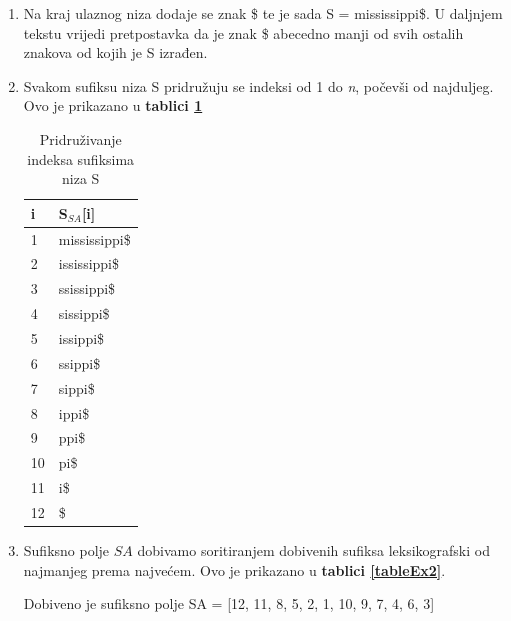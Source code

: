 \documentclass[a4paper,12pt]{article}
\begin{document}
\begin{enumerate}
	\item Na kraj ulaznog niza dodaje se znak \$ te je sada S =  mississippi\$. U daljnjem tekstu vrijedi pretpostavka da je znak \$ abecedno manji od svih ostalih znakova od kojih je S izrađen.
	\item Svakom sufiksu niza S pridružuju se indeksi od 1 do \textit{n}, počevši od najduljeg. Ovo je prikazano u \textbf{tablici \ref{tableEx1}}

	\begin{table}[h!]
		\caption{Pridruživanje indeksa sufiksima niza S}
		\label{tableEx1}
		\begin{center}
			\begin{tabular}{ll}
				\toprule
				i & S$_{SA}$[i] \\
				\midrule
				1 & mississippi\$ \\
				2 & ississippi\$ \\
				3 & ssissippi\$ \\
				4 & sissippi\$ \\
				5 & issippi\$ \\
				6 & ssippi\$ \\
				7 & sippi\$ \\
				8 & ippi\$ \\
				9 & ppi\$ \\
				10 & pi\$ \\
				11 & i\$ \\
				12 & \$ \\
				\bottomrule
			\end{tabular}
		\end{center}
	\end{table}

	\item Sufiksno polje \(SA\) dobivamo soritiranjem dobivenih sufiksa leksikografski od najmanjeg prema najvećem. Ovo je prikazano u \textbf{tablici \ref{tableEx2}}.

	Dobiveno je sufiksno polje SA = [12, 11, 8, 5, 2, 1, 10, 9, 7, 4, 6, 3]


\end{enumerate}
\end{document}
